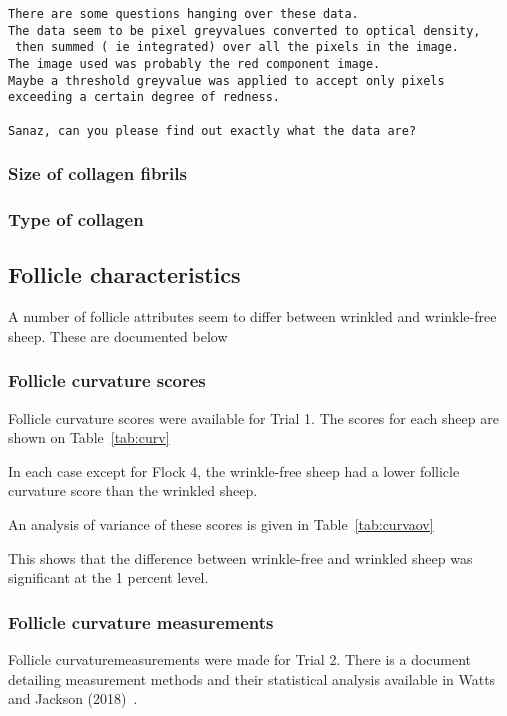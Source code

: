 \documentclass[titlepage]{article}  %
\begin{document}
\begin{verbatim}
There are some questions hanging over these data.
The data seem to be pixel greyvalues converted to optical density,
 then summed ( ie integrated) over all the pixels in the image. 
The image used was probably the red component image.
Maybe a threshold greyvalue was applied to accept only pixels exceeding a certain degree of redness.

Sanaz, can you please find out exactly what the data are?
\end{verbatim}


\subsubsection{Size of collagen fibrils}

\subsubsection{Type of collagen}

\subsection{Follicle characteristics}
A number of follicle attributes seem to differ between wrinkled and wrinkle-free sheep. These are documented below

\subsubsection{Follicle curvature scores}
Follicle curvature scores were available for Trial 1. The scores for each sheep are shown on Table~\ref{tab:curv}

In each case except for Flock 4, the wrinkle-free sheep had a lower follicle curvature score than the wrinkled sheep.

An analysis of variance of these scores is given in Table~\ref{tab:curvaov}

This shows that the difference between wrinkle-free and wrinkled sheep was significant at the 1 percent level.

\subsubsection{Follicle curvature measurements}
Follicle curvaturemeasurements were made for Trial 2. There is a document detailing measurement methods and their statistical analysis available in Watts and Jackson (2018)~\cite{watt:18}. 
\end{document}
